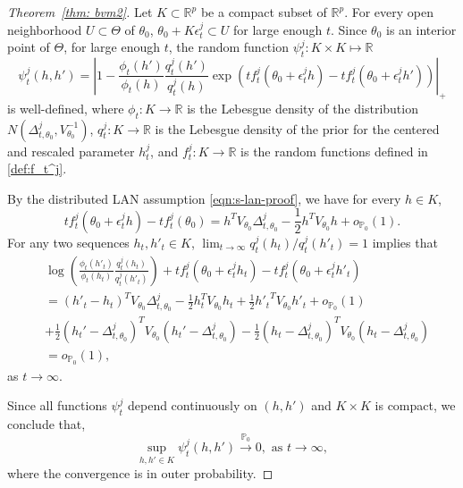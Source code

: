 \documentclass[twoside,11pt]{article}
\numberwithin{equation}{section}
\newcommand{\R}{{\mathbb{R}}}
\newcommand\bP{\mathbb{P}}
\newcommand{\pto}{\stackrel{\bP_0}{\to}}
\begin{document}
{\begin{proof}[Theorem~\ref{thm: bvm2}]
Let $K \subset \R^p$ be a compact subset of $\R^p$. For every open neighborhood $U \subset \Theta$ of $\theta_0$, $\theta_0 + K \epsilon_t^j \subset U$ for large enough $t$. Since $\theta_0$ is an interior point of $\Theta$, for large enough $t$, the random function $\psi_t^j: K \times K \mapsto \R$
\begin{equation*}
\psi_t^j(h, h') = \left\lvert 1 - \frac{\phi_t(h')}{\phi_t(h)} 
\frac{q_t^j(h')}{q_t^j(h)} \exp\left(t f_t^j(\theta_0 + \epsilon_t^j h) - t f_t^j(\theta_0 + \epsilon_t^j h')\right)\right\rvert_+
\end{equation*}
is well-defined,  where $\phi_t: K \rightarrow \R$ is the Lebesgue density of the distribution $N(\Delta_{t, \theta_0}^j, V_{\theta_0}^{-1})$, $q_t^j: K \rightarrow \R$ is the Lebesgue density of the prior for the centered and rescaled parameter $h_t^j$, and $f_t^j: K \rightarrow \R$ is the random functions defined in \eqref{def:f_t^j}. 

By the distributed LAN assumption \eqref{eqn:s-lan-proof}, we have for every $h \in K$, 
\begin{equation*}
t f_t^j(\theta_0 + \epsilon_t^j h) - t f_t^j(\theta_0)= h^T V_{\theta_0} \Delta_{t, \theta_0}^j - \frac{1}{2} h^T V_{\theta_0} h + o_{\bP_0}(1).
\end{equation*}
For any two sequences $h_t, h'_t \in K$, $\lim_{t \to \infty}q_t^j(h_t)/q_t^j(h'_t) =  1$ implies that 
\begin{align*}
&\log \left(\frac{\phi_t(h'_t)}{\phi_t(h_t)}  \frac{q_t^j(h_t)}{q_t^j(h'_t)} \right) + t f_t^j(\theta_0 + \epsilon_t^j h_t) - t f_t^j(\theta_0 + \epsilon_t^j h'_t) \\
&= (h'_t - h_t)^T V_{\theta_0} \Delta_{t, \theta_0}^j - \frac{1}{2} h_t^T V_{\theta_0} h_t + \frac{1}{2} {h'_t}^T V_{\theta_0} h'_t + o_{\bP_0}(1)  \\
& + \frac{1}{2} (h_t' - \Delta_{t, \theta_0}^j )^T V_{\theta_0}(h_t' - \Delta_{t, \theta_0}^j )- \frac{1}{2} (h_t - \Delta_{t, \theta_0}^j )^T V_{\theta_0}(h_t - \Delta_{t, \theta_0}^j )
\\
&= o_{\bP_0}(1),
\end{align*}
as $t \to \infty$. 

Since all functions $\psi_t^j$ depend continuously on $(h, h')$ and $K \times K$ is compact, we conclude that,
\begin{equation} \label{eqn:psi-uniform-convergence}
\sup_{h,h' \in K} \psi_t^j(h, h') \pto 0, \text{ as } t \to \infty,
\end{equation}
where the convergence is in outer probability.


\end{proof}}
\end{document}
